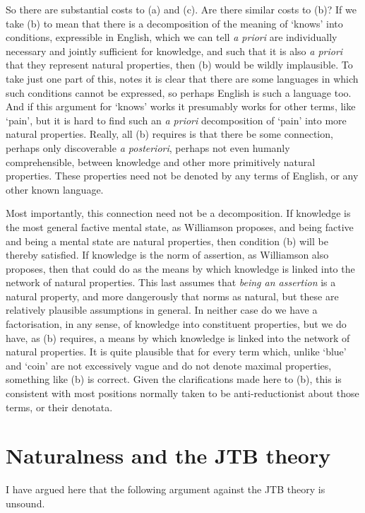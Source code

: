 So there are substantial costs to (a) and (c). Are there similar costs to (b)? If we take (b) to mean that there is a decomposition of the meaning of `knows' into conditions, expressible in English, which we can tell \textit{a priori} are individually necessary and jointly sufficient for knowledge, and such that it is also \textit{a priori} that they represent natural properties, then (b) would be wildly implausible. To take just one part of this, \citet{Williamson2000-WILKAI} notes it is clear that there are some languages in which such conditions cannot be expressed, so perhaps English is such a language too. And if this argument for `knows' works it presumably works for other terms, like `pain', but it is hard to find such an \textit{a priori} decomposition of `pain' into more natural properties. Really, all (b) requires is that there be some connection, perhaps only discoverable \textit{a posteriori}, perhaps not even humanly comprehensible, between knowledge and other more primitively natural properties. These properties need not be denoted by any terms of English, or any other known language.

Most importantly, this connection need not be a decomposition. If knowledge is the most general factive mental state, as Williamson proposes, and being factive and being a mental state are natural properties, then condition (b) will be thereby satisfied. If knowledge is the norm of assertion, as Williamson also proposes, then that could do as the means by which knowledge is linked into the network of natural properties. This last assumes that \textit{being an assertion }is a natural property, and more dangerously that norms as natural, but these are relatively plausible assumptions in general. In neither case do we have a factorisation, in any sense, of knowledge into constituent properties, but we do have, as (b) requires, a means by which knowledge is linked into the network of natural properties. It is quite plausible that for every term which, unlike `blue' and `coin' are not excessively vague and do not denote maximal properties, something like (b) is correct. Given the clarifications made here to (b), this is consistent with most positions normally taken to be anti-reductionist about those terms, or their denotata.


\section{Naturalness and the JTB theory}

I have argued here that the following argument against the JTB theory is unsound.

